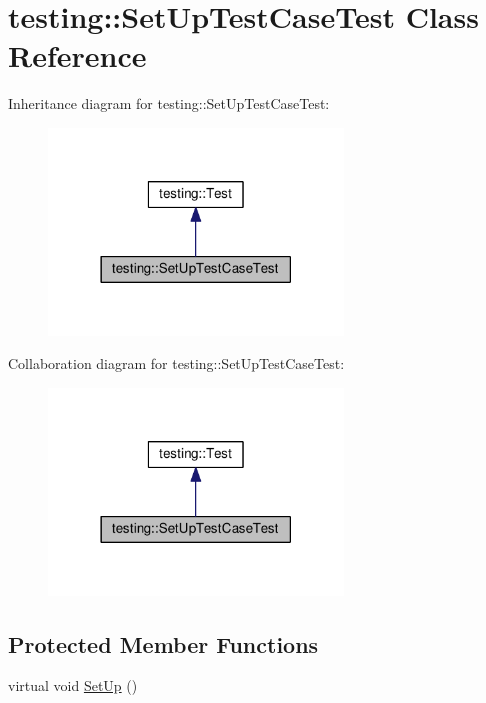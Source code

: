 \hypertarget{classtesting_1_1SetUpTestCaseTest}{}\section{testing\+:\+:Set\+Up\+Test\+Case\+Test Class Reference}
\label{classtesting_1_1SetUpTestCaseTest}


Inheritance diagram for testing\+:\+:Set\+Up\+Test\+Case\+Test\+:\nopagebreak
\begin{figure}[H]
\begin{center}
\leavevmode
\includegraphics[width=222pt]{classtesting_1_1SetUpTestCaseTest__inherit__graph}
\end{center}
\end{figure}


Collaboration diagram for testing\+:\+:Set\+Up\+Test\+Case\+Test\+:\nopagebreak
\begin{figure}[H]
\begin{center}
\leavevmode
\includegraphics[width=222pt]{classtesting_1_1SetUpTestCaseTest__coll__graph}
\end{center}
\end{figure}
\subsection*{Protected Member Functions}
\begin{DoxyCompactItemize}
\item 
virtual void \hyperlink{classtesting_1_1SetUpTestCaseTest_a4b44551ccf73e66de7ec95b2ab3b2085}{Set\+Up} ()
\end{DoxyCompactItemize}
